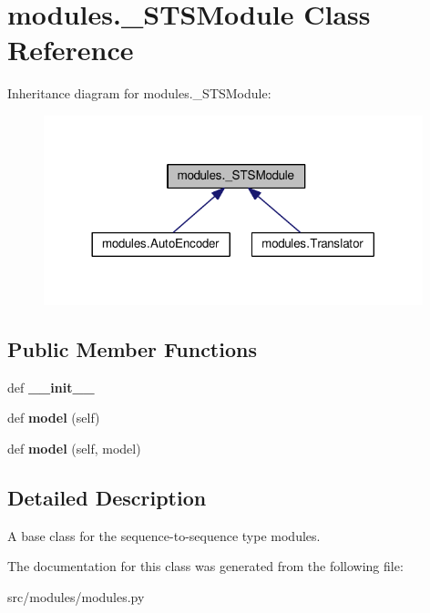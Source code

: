 \hypertarget{classmodules_1_1__STSModule}{}\section{modules.\+\_\+\+S\+T\+S\+Module Class Reference}
\label{classmodules_1_1__STSModule}


Inheritance diagram for modules.\+\_\+\+S\+T\+S\+Module\+:
\nopagebreak
\begin{figure}[H]
\begin{center}
\leavevmode
\includegraphics[width=312pt]{classmodules_1_1__STSModule__inherit__graph}
\end{center}
\end{figure}
\subsection*{Public Member Functions}
\begin{DoxyCompactItemize}
\item 
def {\bfseries \+\_\+\+\_\+init\+\_\+\+\_\+}\hypertarget{classmodules_1_1__STSModule_a634c7045b2702b3083efe93386d60d22}{}\label{classmodules_1_1__STSModule_a634c7045b2702b3083efe93386d60d22}

\item 
def {\bfseries model} (self)\hypertarget{classmodules_1_1__STSModule_a39d3e3d2d8bc1c5b5345c40629394834}{}\label{classmodules_1_1__STSModule_a39d3e3d2d8bc1c5b5345c40629394834}

\item 
def {\bfseries model} (self, model)\hypertarget{classmodules_1_1__STSModule_aeca7d7f6542570f382e6469723db1b04}{}\label{classmodules_1_1__STSModule_aeca7d7f6542570f382e6469723db1b04}

\end{DoxyCompactItemize}


\subsection{Detailed Description}
\begin{DoxyVerb}A base class for the sequence-to-sequence type modules.
\end{DoxyVerb}
 

The documentation for this class was generated from the following file\+:\begin{DoxyCompactItemize}
\item 
src/modules/modules.\+py\end{DoxyCompactItemize}
